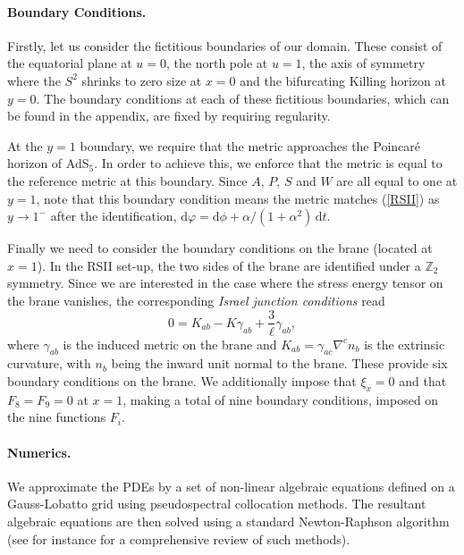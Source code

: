 \documentclass[%
 reprint,
 amsmath,amssymb,
 aps,
]{revtex4-2}
\begin{document}
\paragraph{Boundary Conditions.}
Firstly, let us consider the fictitious boundaries of our domain. These consist of the equatorial plane at $u=0$, the north pole at $u=1$, the axis of symmetry where the $S^2$ shrinks to zero size at $x=0$ and the bifurcating Killing horizon at $y=0$. The boundary conditions at each of these fictitious boundaries, which can be found in the appendix, are fixed by requiring regularity.

At the $y=1$ boundary, we require that the metric approaches the Poincar\'e horizon of AdS$_5$. In order to achieve this, we enforce that the metric is equal to the reference metric at this boundary. Since $A,\,P,\,S$ and $W$ are all equal to one at $y=1$, note that this boundary condition means the metric matches (\ref{RSII}) as $y\to 1^-$ after the identification, $\mathrm{d}\varphi = \mathrm{d}\phi + \alpha/(1+\alpha^2)\,\mathrm{d}t$.

Finally we need to consider the boundary conditions on the brane (located at $x=1$). In the RSII set-up, the two sides of the brane are identified under a $\mathbb{Z}_2$ symmetry. Since we are interested in the case where the stress energy tensor on the brane vanishes, the corresponding  \textit{Israel junction conditions} \cite{Israel:1966rt} read
\begin{equation}
    0 = K_{ab} - K \gamma_{ab} + \frac{3}{\ell}\gamma_{ab},
\end{equation}
where $\gamma_{ab}$ is the induced metric on the brane and $K_{ab} = \gamma_{ac} \nabla^c n_b$ is the extrinsic curvature, with $n_b$ being the inward unit normal to the brane. These provide six boundary conditions on the brane. We additionally impose that $\xi_x = 0$ and that $F_8 = F_9 = 0$ at $x=1$, making a total of nine boundary conditions, imposed on the nine functions $F_i$.
\paragraph{Numerics.}
We approximate the PDEs by a set of non-linear algebraic equations defined on a Gauss-Lobatto grid using pseudospectral collocation methods. The resultant algebraic equations are then solved using a standard Newton-Raphson algorithm (see for instance \cite{Dias:2015nua} for a comprehensive review of such methods).
\end{document}
